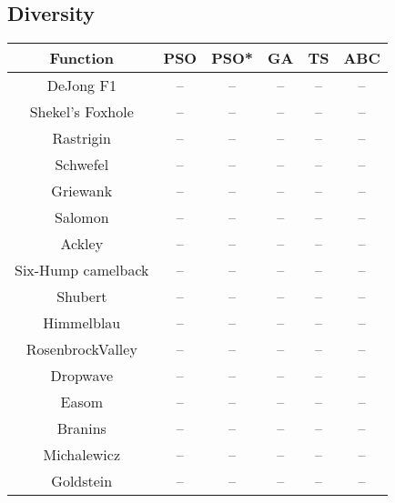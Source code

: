 \subsection{Diversity}
\begin{center}
	\begin{tabular}{| c | c | c | c | c | c |}
	\hline
	Function & PSO & PSO* & GA & TS & ABC\\  \hline
	DeJong F1 & -- & -- & -- & -- & --\\ \hline
	Shekel's Foxhole & -- & -- & -- & -- & --\\ \hline
	Rastrigin & -- & -- & -- & -- & --\\ \hline
	Schwefel & -- & -- & -- & -- & --\\ \hline
	Griewank & -- & -- & -- & -- & --\\ \hline
	Salomon & -- & -- & -- & -- & --\\ \hline
	Ackley & -- & -- & -- & -- & --\\ \hline
	Six-Hump camelback & -- & -- & -- & -- & --\\ \hline
	Shubert & -- & -- & -- & -- & --\\ \hline
	Himmelblau & -- & -- & -- & -- & --\\ \hline
	RosenbrockValley & -- & -- & -- & -- & --\\ \hline
	Dropwave & -- & -- & -- & -- & --\\ \hline
	Easom & -- & -- & -- & -- & --\\ \hline
	Branins & -- & -- & -- & -- & --\\ \hline
	Michalewicz & -- & -- & -- & -- & --\\ \hline
	Goldstein & -- & -- & -- & -- & --\\ \hline
	\end{tabular}
\end{center}
